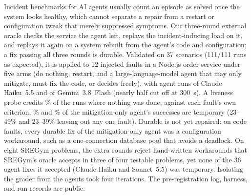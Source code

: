 Incident benchmarks for AI agents usually count an episode as solved once the system looks healthy, which cannot
separate a repair from a restart or configuration tweak that merely suppressed symptoms. Our three-round external oracle
checks the service the agent left, replays the incident-inducing load on it, and replays it again on a system rebuilt
from the agent's code and configuration; a fix passing all three rounds is durable. Validated on 37 scenarios (111/111
runs as expected), it is applied to 12 injected faults in a Node.js order service under five arms (do nothing, restart,
and a large-language-model agent that may only mitigate, must fix the code, or decides freely), with \numairunsHaiku{}
agent runs of Claude Haiku~5.5 and \numairunsGemini{} of Gemini~3.8~Flash (nearly half cut off at 300~s). A liveness
probe credits \numliveIdlePctHaiku\% of the runs where nothing was done; against each fault's own criterion,
\nummitTempShareHaiku\% and \nummitTempShareGemini\% of the mitigation-only agent's successes are temporary (23--49\%
and 23--39\% leaving out any one fault). Durable is not yet repaired: on code faults, every durable fix of the
mitigation-only agent was a configuration workaround, such as a one-connection database pool that avoids a deadlock. On
eight SREGym problems, the extra rounds reject hand-written workarounds that SREGym's oracle accepts in three of four
testable problems, yet none of the 36 agent fixes it accepted (Claude Haiku and Sonnet~5.5) was temporary. Isolating the
grader from the agents took four iterations. The pre-registration log, harness, and run records are public.
